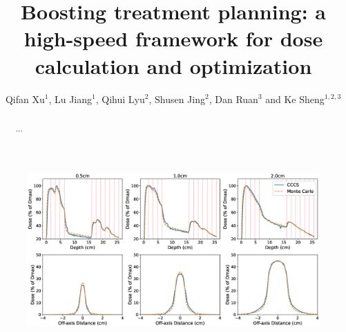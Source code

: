\documentclass[12pt]{iopart}
\begin{document}
\title[Boosting treatment planning]{Boosting treatment planning: a high-speed framework for dose calculation and optimization}

\author{Qifan Xu$^1$, Lu Jiang$^1$, Qihui Lyu$^2$, Shusen Jing$^2$, Dan Ruan$^3$ and Ke Sheng$^{1,2,3}$}
\address{$^1$UCSF-UC Berkeley Joint PhD Program in Bioengineering, San Francisco, CA, USA}
\address{$^2$Department of Radiation Oncology, University of California, San Francisco, San Francisco, CA, USA}
\address{$^3$Department of Radiation Oncology, University of California, Los Angeles, Los Angeles, CA, USA}

\begin{abstract}
...
\end{abstract}
\submitto{\PMB}
\maketitle

\begin{figure}
    \centering
    \includegraphics[width=\textwidth]{SlabDose.eps}
\end{figure}
\end{document}

